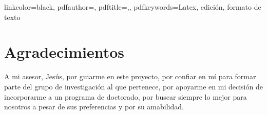 \documentclass[fontsize=11pt, English=false, Español=true, Myfinal=true, twoside, numbers=noenddot]{scrbook}
\begin{document}




\hypersetup
	{
 	linkcolor=black, %
	pdfauthor={\elautor},
	pdftitle={\nombretrabajo,\eltitulo}, 
	pdfkeywords={Latex, edición, formato de texto}	
	 }



\frontmatter
{} %

%
\chapter*{Agradecimientos}
\pagestyle{empty}

\lettrine[lraise=-0.1, lines=2, loversize=0.25]{}{}
A mi asesor, Jesús, por guiarme en este proyecto, por confiar en mí para formar parte del grupo de investigación al que pertenece, por apoyarme en mi decisión de incorporarme a un programa de doctorado, por buscar siempre lo mejor para nosotros a pesar de sus preferencias y por su amabilidad. 
\end{document}
